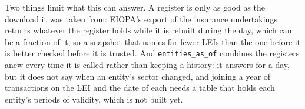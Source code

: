 Two things limit what this can answer. A register is only as good as the download it was taken from: EIOPA's export of the insurance undertakings returns whatever the register holds while it is rebuilt during the day, which can be a fraction of it, so a snapshot that names far fewer LEIs than the one before it is better checked before it is trusted. And \verb|entities_as_of| combines the registers anew every time it is called rather than keeping a history: it answers for a day, but it does not say when an entity's sector changed, and joining a year of transactions on the LEI and the date of each needs a table that holds each entity's periods of validity, which is not built yet.
